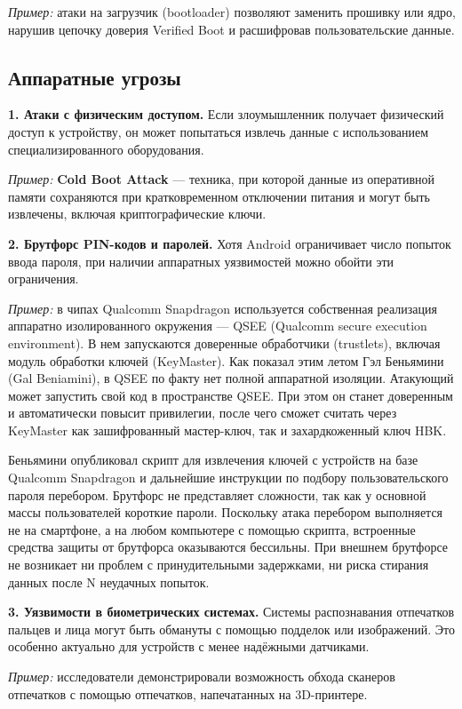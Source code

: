 \textit{Пример:} атаки на загрузчик (bootloader) позволяют заменить прошивку
или ядро, нарушив цепочку доверия Verified Boot и расшифровав пользовательские
данные.

\subsection{Аппаратные угрозы}

\textbf{1. Атаки с физическим доступом.}
Если злоумышленник получает физический доступ к устройству, он может попытаться
извлечь данные с использованием специализированного оборудования.

\textit{Пример:} \textbf{Cold Boot Attack} — техника, при которой данные из
оперативной памяти сохраняются при кратковременном отключении питания и могут
быть извлечены, включая криптографические ключи.

\textbf{2. Брутфорс PIN-кодов и паролей.}
Хотя Android ограничивает число попыток ввода пароля, при наличии аппаратных
уязвимостей можно обойти эти ограничения.

\textit{Пример:} в чипах Qualcomm Snapdragon используется собственная
реализация аппаратно изолированного окружения — QSEE (Qualcomm secure execution
environment). В нем запускаются доверенные обработчики (trustlets), включая
модуль обработки ключей (KeyMaster). Как показал этим летом Гэл Беньямини (Gal
Beniamini), в QSEE по факту нет полной аппаратной изоляции. Атакующий может
запустить свой код в пространстве QSEE. При этом он станет доверенным и
автоматически повысит привилегии, после чего сможет считать через KeyMaster как
зашифрованный мастер-ключ, так и захардкоженный ключ HBK.

Беньямини опубликовал скрипт для извлечения ключей с устройств на базе Qualcomm
Snapdragon и дальнейшие инструкции по подбору пользовательского пароля
перебором. Брутфорс не представляет сложности, так как у основной массы
пользователей короткие пароли. Поскольку атака перебором выполняется не на
смартфоне, а на любом компьютере с помощью скрипта, встроенные средства защиты
от брутфорса оказываются бессильны. При внешнем брутфорсе не возникает ни
проблем с принудительными задержками, ни риска стирания данных после N
неудачных попыток.

\textbf{3. Уязвимости в биометрических системах.}
Системы распознавания отпечатков пальцев и лица могут быть обмануты с помощью
подделок или изображений. Это особенно актуально для устройств с менее
надёжными датчиками.

\textit{Пример:} исследователи демонстрировали возможность обхода сканеров
отпечатков с помощью отпечатков, напечатанных на 3D-принтере.

